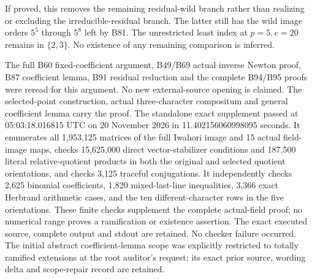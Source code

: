 \begin{remark}
\label{rem:B-RD96-scope}
If proved, this removes the remaining residual-wild branch rather
than realizing or excluding the irreducible-residual branch.
The latter still has the wild image orders $5^5$ through $5^8$
left by B81. The unrestricted least index at $p=5,e=20$ remains
in $\{2,3\}$. No existence of any remaining comparison is inferred.

The full B60 fixed-coefficient argument, B49/B69 actual inverse
Newton proof, B87 coefficient lemma, B91 residual reduction and
the complete B94/B95 proofs were reread for this argument.
No new external-source opening is claimed. The selected-point
construction, actual three-character compositum and general
coefficient lemma carry the proof. The standalone exact supplement
passed at 05:03:18.016815 UTC on 20 November 2026 in
11.402156060998095 seconds. It enumerates all 1,953,125 matrices
of the full Iwahori image and 15 actual field-image maps, checks
15,625,000 direct vector-stabilizer conditions and 187,500 literal
relative-quotient products in both the original and selected quotient
orientations, and checks 3,125 traceful conjugations. It independently
checks 2,625 binomial coefficients, 1,820 mixed-last-line inequalities,
3,366 exact Herbrand arithmetic cases, and the ten different-character
rows in the five orientations. These finite checks supplement the
complete actual-field proof; no numerical range proves a ramification
or existence assertion. The exact executed source, complete output
and stdout are retained. No checker failure occurred. The initial
abstract coefficient-lemma scope was explicitly restricted to totally
ramified extensions at the root auditor's request; its exact prior
source, wording delta and scope-repair record are retained.
\end{remark}
